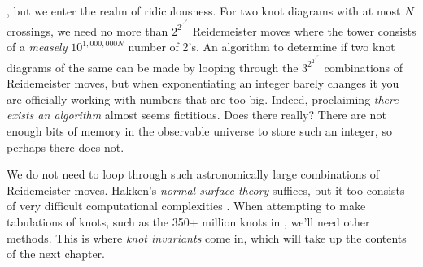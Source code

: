     \cite{CowardLackenbyReidemeisterUpperBound}, but we enter the realm of
    ridiculousness. For two knot diagrams with at most $N$ crossings, we need
    no more than $2^{2^{\cdot^{\cdot^{\cdot^{{2^{N}}}}}}}$ Reidemeister moves
    where the tower consists of a \textit{measely}
    $10^{1,000,000N}$ number of 2's. An algorithm to determine if two knot
    diagrams of the same can be made by looping through the
    $3^{2^{2^{\cdot^{\cdot^{\cdot^{{2^{N}}}}}}}}$ combinations of Reidemeister
    moves, but when exponentiating an integer barely changes it
    you are officially working with numbers that are too big. Indeed,
    proclaiming \textit{there exists an algorithm} almost seems fictitious.
    Does there really? There are not enough bits of memory in the observable
    universe to store such an integer, so perhaps there does not.
    \par\hfill\par
    We do not need to loop through such astronomically large combinations of
    Reidemeister moves. Hakken's \textit{normal surface theory} suffices,
    but it too consists of very difficult computational complexities
    \cite{HASS1998569}. When attempting to make tabulations of knots,
    such as the 350+ million knots in \cite{Burton2020TheN3}, we'll need
    other methods. This is where \textit{knot invariants} come in, which will
    take up the contents of the next chapter.
